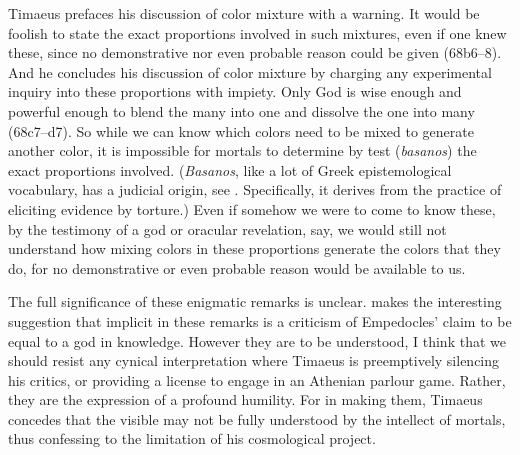 Timaeus prefaces his discussion of color mixture with a warning. It would be foolish to state the exact proportions involved in such mixtures, even if one knew these, since no demonstrative nor even probable reason could be given (68b6--8). And he concludes his discussion of color mixture by charging any experimental inquiry into these proportions with impiety. Only God is wise enough and powerful enough to blend the many into one and dissolve the one into many (68c7--d7). So while we can know which colors need to be mixed to generate another color, it is impossible for mortals to determine by test (\emph{basanos}) the exact proportions involved. (\emph{Basanos}, like a lot of Greek epistemological vocabulary, has a judicial origin, see \citealt[chapter 4]{Lloyd:1979lc}. Specifically, it derives from the practice of eliciting evidence by torture.) Even if somehow we were to come to know these, by the testimony of a god or oracular revelation, say, we would still not understand how mixing colors in these proportions generate the colors that they do, for no demonstrative or even probable reason would be available to us.

The full significance of these enigmatic remarks is unclear. \citet[173--4]{Brisson:1997qr} makes the interesting suggestion that implicit in these remarks is a criticism of Empedocles' claim to be equal to a god in knowledge. However they are to be understood, I think that we should resist any cynical interpretation where Timaeus is preemptively silencing his critics, or providing a license to engage in an Athenian parlour game. Rather, they are the expression of a profound humility. For in making them, Timaeus concedes that the visible may not be fully understood by the intellect of mortals, thus confessing to the limitation of his cosmological project.

